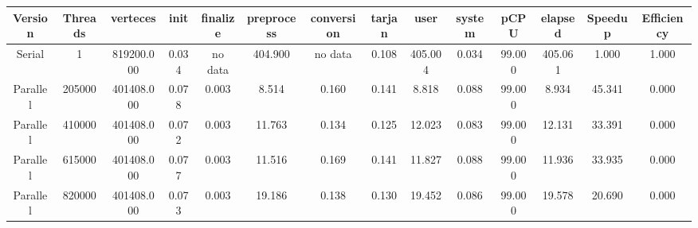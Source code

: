 \begin{tabular}{|c|c|c|c|c|c|c|c|c|c|c|c|c|c|}
\toprule
 Version &  Threads &   verteces &  init & finalize &  preprocess & conversion &  tarjan &    user &  system &   pCPU &  elapsed &  Speedup &  Efficiency \\
\midrule
  Serial &        1 & 819200.000 & 0.034 &  no data &     404.900 &    no data &   0.108 & 405.004 &   0.034 & 99.000 &  405.061 &    1.000 &       1.000 \\
Parallel &   205000 & 401408.000 & 0.078 &    0.003 &       8.514 &      0.160 &   0.141 &   8.818 &   0.088 & 99.000 &    8.934 &   45.341 &       0.000 \\
Parallel &   410000 & 401408.000 & 0.072 &    0.003 &      11.763 &      0.134 &   0.125 &  12.023 &   0.083 & 99.000 &   12.131 &   33.391 &       0.000 \\
Parallel &   615000 & 401408.000 & 0.077 &    0.003 &      11.516 &      0.169 &   0.141 &  11.827 &   0.088 & 99.000 &   11.936 &   33.935 &       0.000 \\
Parallel &   820000 & 401408.000 & 0.073 &    0.003 &      19.186 &      0.138 &   0.130 &  19.452 &   0.086 & 99.000 &   19.578 &   20.690 &       0.000 \\
\bottomrule
\end{tabular}
